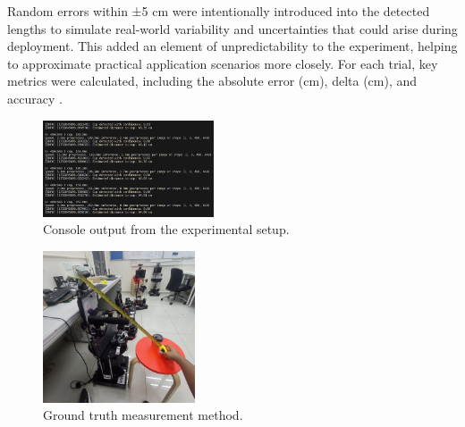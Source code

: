 Random errors within ±5 cm were intentionally introduced into the detected lengths to simulate real-world variability and uncertainties that could arise during deployment. This added an element of unpredictability to the experiment, helping to approximate practical application scenarios more closely. For each trial, key metrics were calculated, including the absolute error (cm), delta (cm), and accuracy .

\begin{figure}[!ht]  %
  \centering
  \includegraphics[width=0.45\textwidth]{content/console.png}
  \caption{Console output from the experimental setup.}
  \label{fig:experiment-setup-console}
\end{figure}

\begin{figure}[!ht]  %
  \centering
  \includegraphics[width=0.4\textwidth]{content/ground Truth.jpg}
  \caption{Ground truth measurement method.}
  \label{fig:ground-truth-method}
\end{figure}

